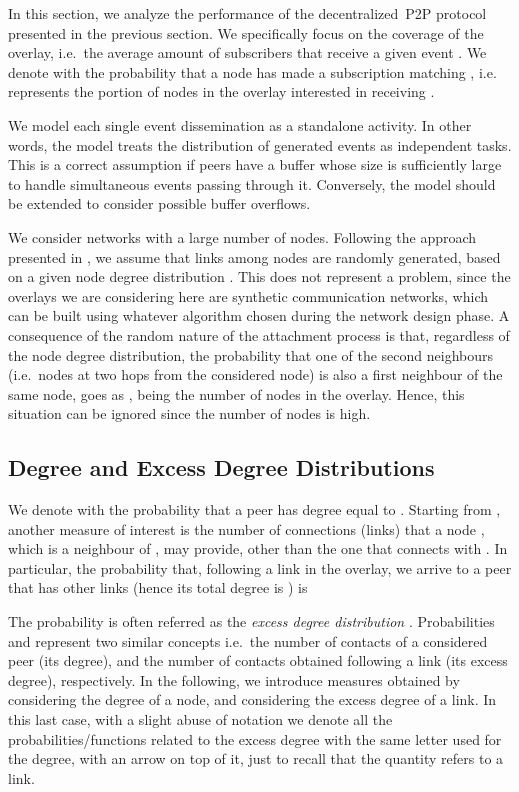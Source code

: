 \documentclass[10pt, conference, compsocconf]{IEEEtran}
\begin{document}
In this section, we analyze the performance of the decentralized~\ac{P2P} protocol presented in the previous section. We specifically focus on the coverage of the overlay, i.e.~the average amount of subscribers  that receive a given event . 
We denote with  the probability that a node has made a subscription matching , i.e.~ represents the portion of nodes in the overlay interested in receiving . 

We model each single event dissemination as a standalone activity. In other words, the model treats the distribution of generated events as independent tasks. This is a correct assumption if peers have a buffer whose size is sufficiently large to handle simultaneous events passing through it. Conversely, the model should be extended to consider possible buffer overflows. 

We consider networks with a large number of nodes. Following the approach presented in \cite{newman03thestructure,newmanHandbook}, we assume that links among nodes are randomly generated, based on a given node degree distribution \cite{BenderC78}. 
This does not represent a problem, since the overlays we are considering here are synthetic communication networks, which can be built using whatever algorithm chosen during the network design phase.
A consequence of the random nature of the attachment process is that, regardless of the node degree distribution, the probability that one of the second neighbours (i.e.~nodes at two hops from the considered node) is also a first neighbour of the same node, goes as , being  the number of nodes in the overlay. Hence, this situation can be ignored since the number of nodes is high. 

\subsection{Degree and Excess Degree Distributions}

We denote with  the probability that a peer  has degree equal to . Starting from , another measure of interest is the number of connections (links) that a node , which is a neighbour of , may provide, other than the one that connects  with . In particular, the probability that, following a link in the overlay, we arrive to a peer  that has other  links (hence its total degree is ) is

The probability  is often referred as the \emph{excess degree distribution} \cite{newman03thestructure}. Probabilities  and  represent two similar concepts i.e.~the number of contacts of a considered peer (its degree), and the number of contacts obtained following a link (its excess degree), respectively. In the following, we introduce measures obtained by considering the degree  of a node, and considering the excess degree  of a link. In this last case, with a slight abuse of notation we denote all the probabilities/functions related to the excess degree with the same letter used for the degree, with an arrow on top of it, just to recall that the quantity refers to a link.
\end{document}
